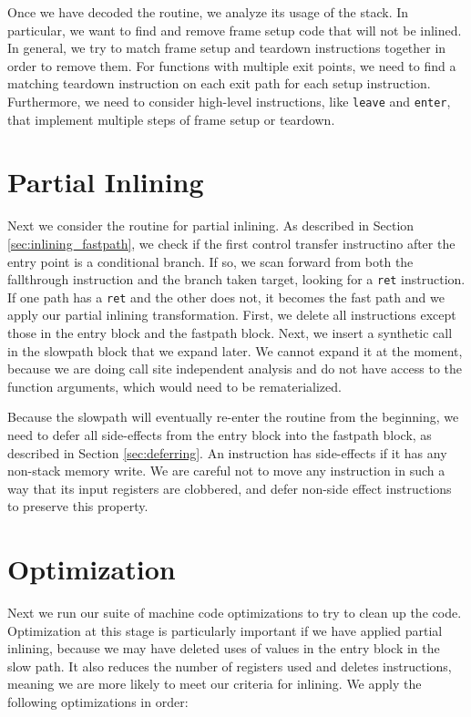 Once we have decoded the routine, we analyze its usage of the stack.  In
particular, we want to find and remove frame setup code that will not be
inlined.  In general, we try to match frame setup and teardown instructions
together in order to remove them.  For functions with multiple exit points, we
need to find a matching teardown instruction on each exit path for each setup
instruction.  Furthermore, we need to consider high-level instructions, like
{\tt leave} and {\tt enter}, that implement multiple steps of frame setup or
teardown.

\section{Partial Inlining}

Next we consider the routine for partial inlining.  As described in Section
\ref{sec:inlining_fastpath}, we check if the first control transfer instructino
after the entry point is a conditional branch.  If so, we scan forward from both
the fallthrough instruction and the branch taken target, looking for a {\tt ret}
instruction.  If one path has a {\tt ret} and the other does not, it becomes the
fast path and we apply our partial inlining transformation.  First, we delete
all instructions except those in the entry block and the fastpath block.  Next,
we insert a synthetic call in the slowpath block that we expand later.  We
cannot expand it at the moment, because we are doing call site independent
analysis and do not have access to the function arguments, which would need to
be rematerialized.

Because the slowpath will eventually re-enter the routine from the beginning, we
need to defer all side-effects from the entry block into the fastpath block, as
described in Section \ref{sec:deferring}.  An instruction has side-effects if it
has any non-stack memory write.  We are careful not to move any instruction in
such a way that its input registers are clobbered, and defer non-side effect
instructions to preserve this property.

\section{Optimization}

Next we run our suite of machine code optimizations to try to clean up the code.
Optimization at this stage is particularly important if we have applied partial
inlining, because we may have deleted uses of values in the entry block in the
slow path.  It also reduces the number of registers used and deletes
instructions, meaning we are more likely to meet our criteria for inlining.  We
apply the following optimizations in order:

